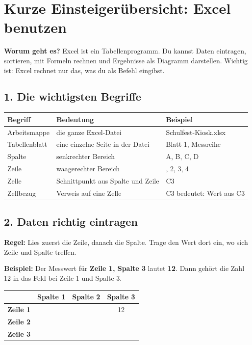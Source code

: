 \section*{Kurze Einsteigerübersicht: Excel benutzen}

\begin{boxK}
\textbf{Worum geht es?} Excel ist ein Tabellenprogramm. Du kannst Daten eintragen, sortieren, mit Formeln rechnen und Ergebnisse als Diagramm darstellen. Wichtig ist: Excel rechnet nur das, was du als Befehl eingibst.
\end{boxK}

\subsection*{1. Die wichtigsten Begriffe}
\renewcommand{\arraystretch}{1.35}
\begin{tabularx}{\textwidth}{|>{\raggedright\arraybackslash}p{3.0cm}|>{\raggedright\arraybackslash}X|>{\raggedright\arraybackslash}p{3.0cm}|}
\hline
\rowcolor{gray!20}\textbf{Begriff} & \textbf{Bedeutung} & \textbf{Beispiel} \\\hline
Arbeitsmappe & die ganze Excel-Datei & Schulfest-Kiosk.xlsx \\\hline
Tabellenblatt & eine einzelne Seite in der Datei & Blatt 1, Messreihe \\\hline
Spalte & senkrechter Bereich & A, B, C, D \\\hline
Zeile & waagerechter Bereich & 1, 2, 3, 4 \\\hline
Zelle & Schnittpunkt aus Spalte und Zeile & C3 \\\hline
Zellbezug & Verweis auf eine Zelle & C3 bedeutet: Wert aus C3 \\\hline
\end{tabularx}

\subsection*{2. Daten richtig eintragen}
\begin{boxK}
\textbf{Regel:} Lies zuerst die Zeile, danach die Spalte. Trage den Wert dort ein, wo sich Zeile und Spalte treffen.
\end{boxK}

\textbf{Beispiel:} Der Messwert für \textbf{Zeile 1, Spalte 3} lautet \textbf{12}. Dann gehört die Zahl 12 in das Feld bei Zeile 1 und Spalte 3.

\vspace{0.2cm}
\begin{center}
\begin{tabular}{|c|c|c|c|}
\hline
 & \textbf{Spalte 1} & \textbf{Spalte 2} & \textbf{Spalte 3} \\\hline
\textbf{Zeile 1} & & & 12 \\\hline
\textbf{Zeile 2} & & & \\\hline
\textbf{Zeile 3} & & & \\\hline
\end{tabular}
\end{center}

